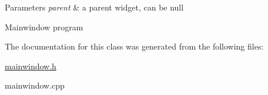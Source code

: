 \begin{DoxyParams}{Parameters}
{\em parent} & a parent widget, can be null\\
\hline
\end{DoxyParams}
Mainwindow program 

The documentation for this class was generated from the following files\-:\begin{DoxyCompactItemize}
\item 
\hyperlink{mainwindow_8h}{mainwindow.\-h}\item 
mainwindow.\-cpp\end{DoxyCompactItemize}
